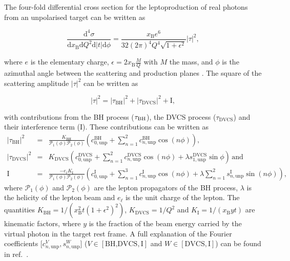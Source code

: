 The four-fold differential cross section for the  leptoproduction of real photons
from an unpolarised target can be written as \cite{Bel02b}
\begin{center}
\begin{equation}
\frac{\textrm{d}^4\sigma}{\textrm{d}x_{\textrm{B}}\textrm{d}Q^{2}\textrm{d}
|t|\textrm{d}\phi} =
\frac{x_{\textrm{B}}e^{6}}{32(2\pi)^{4} Q^{4}\sqrt{1+\epsilon^{2}}}
|\tau|^{2},
\end{equation}
\end{center}
where $e$ is the elementary
charge, $\epsilon=2x_\textrm{B}\frac{M}{Q}$ with $M$
the  mass, and $\phi$ is the
azimuthal angle between the scattering and production planes \cite{Tre04}.
The {square of the} scattering amplitude $|\tau|^2$ can be written as
\begin{center}
\begin{equation}
|\tau|^{2} = |\tau_{\textrm{BH}}|^{2} +
|\tau_{\textrm{DVCS}}|^{2} + \textrm{I},
\end{equation}
\end{center}
with contributions from the \textrm{BH} process ($\tau_{\textrm{\textrm{BH}}}$),
the DVCS process
($\tau_{\textrm{DVCS}}$) and their interference term (I). These
contributions can be written as
\begin{eqnarray}
 |\tau_{\textrm{BH}}|^{2} &=&
 \frac{K_{\textrm{BH}}}{\mathcal{P}_{1}(\phi)\mathcal{P}_{2}(\phi)} \left(c_{0,\textrm{unp}}^{\textrm{BH}} + \sum_{n=1}^2
  c_{n,\textrm{unp}}^{\textrm{BH}}\cos(n\phi)\right), \label{e:tbh}\\
|\tau_{\textrm{DVCS}}|^{2} &=&
K_{\textrm{DVCS}}\left(c_{0,\textrm{unp}}^{\textrm{DVCS}} +
\sum_{n=1}^2
c_{n,\textrm{unp}}^{\textrm{DVCS}}\cos(n\phi) + \lambda
s_{1,\textrm{unp}}^{\textrm{DVCS}}\sin\phi\right)\,\textrm{and}
\label{e:tdvcs}\\
 \textrm{I} &=& \frac{- e_\ell
K_{\textrm{I}}}{\mathcal{P}_{1}(\phi)\mathcal{P}_{2}(\phi)}\left(c_{0,\textrm{unp}}^{\textrm{
I}}+
\sum_{n=1}^3 c_{n,\textrm{unp}}^{\textrm{I}}\cos(n\phi) + \lambda \sum_{n=1}^2
s_{n,\textrm{unp}}^{\textrm{I}}\sin(n\phi)\right),\label{e:ti}
\end{eqnarray}
where $\mathcal{P}_1(\phi)$ and $\mathcal{P}_2(\phi)$ are the lepton propagators
of the BH process, $\lambda$ is the
helicity of the lepton beam and $e_\ell$ is the unit charge of
  the lepton.  The
quantities $K_{\textrm{BH}}=1/(x_\textrm{B}^2t(1+\epsilon^2)^2)$,
$K_{\textrm{DVCS}}=1/Q^2$
and $K_{\textrm{I}}=1/(x_{\textrm{B}}yt)$ are kinematic factors, where
$y$ is the fraction of the beam energy carried by the virtual photon in
the target rest frame. A full
explanation of the Fourier coefficients [$c_{n,\textrm{unp}}^V,s_{n,\textrm{unp}}^W$]
($V\in[\textrm{BH,DVCS},\textrm{I}]$ and $W\in[\textrm{DVCS},\textrm{I}]$) can be found in ref.~\cite{Bel02b}.
 
